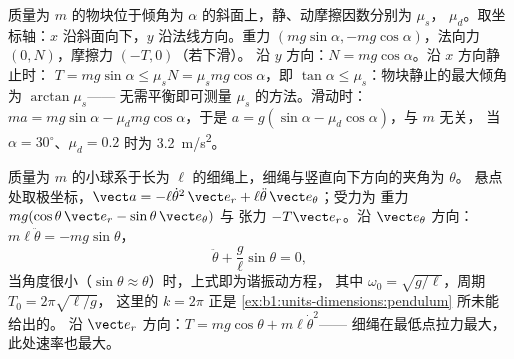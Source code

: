 \begin{example}[斜面上的物块]\label{ex:b1:newton-dynamics:incline}
质量为 $m$ 的物块位于倾角为 $\alpha$ 的斜面上，静、动摩擦因数分别为 $\mu_s$，
$\mu_d$。取坐标轴：$x$ 沿斜面向下，$y$ 沿法线方向。重力
$(mg\sin\alpha, -mg\cos\alpha)$，法向力 $(0, N)$，摩擦力 $(-T, 0)$（若下滑）。
沿 $y$ 方向：$N = mg\cos\alpha$。沿 $x$ 方向静止时：
$T = mg\sin\alpha \leq \mu_sN = \mu_smg\cos\alpha$，即 $\tan\alpha
\leq \mu_s$：物块静止的最大倾角为 $\arctan\mu_s$——
无需平衡即可测量 $\mu_s$ 的方法。滑动时：$ma = mg\sin\alpha -
\mu_dmg\cos\alpha$，于是 $a = g(\sin\alpha - \mu_d\cos\alpha)$，与 $m$ 无关，
当 $\alpha = 30^\circ$、$\mu_d = 0.2$ 时为 \qty{3.2}{m/s^2}。
\end{example}

\begin{example}[单摆]\label{ex:b1:newton-dynamics:pendulum}
质量为 $m$ 的小球系于长为 $\ell$ 的细绳上，细绳与竖直向下方向的夹角为 $\theta$。
悬点处取极坐标，$\vect a =
-\ell\dot\theta^2\,\vect e_r + \ell\ddot\theta\,\vect e_\theta$；受力为
重力 $mg(\cos\theta\,\vect e_r - \sin\theta\,\vect e_\theta)$ 与
张力 $-T\vect e_r$。沿 $\vect e_\theta$ 方向：$m\ell\ddot\theta =
-mg\sin\theta$，
\[
\ddot\theta + \frac{g}{\ell}\sin\theta = 0 ,
\]
当角度很小（$\sin\theta \approx \theta$）时，上式即为谐振动方程，
其中 $\omega_0 = \sqrt{g/\ell}$，周期 $T_0 = 2\pi\sqrt{\ell/g}$，
这里的 $k = 2\pi$ 正是 \cref{ex:b1:units-dimensions:pendulum} 所未能给出的。
沿 $\vect e_r$ 方向：$T = mg\cos\theta + m\ell\dot\theta^2$——
细绳在最低点拉力最大，此处速率也最大。
\end{example}


